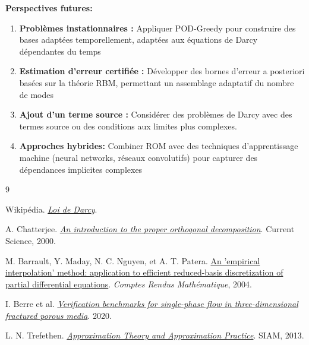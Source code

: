\documentclass[12pt,a4paper]{article}
\begin{document}
\textbf{Perspectives futures:}
\begin{enumerate}
    \item \textbf{Problèmes instationnaires :} Appliquer POD-Greedy pour construire des bases adaptées temporellement, adaptées aux équations de Darcy dépendantes du temps
    \item \textbf{Estimation d'erreur certifiée :} Développer des bornes d'erreur a posteriori basées sur la théorie RBM, permettant un assemblage adaptatif du nombre de modes
    \item \textbf{Ajout d'un terme source :} Considérer des problèmes de Darcy avec des termes source ou des conditions aux limites plus complexes.
    \item \textbf{Approches hybrides:} Combiner ROM avec des techniques d'apprentissage machine (neural networks, réseaux convolutifs) pour capturer des dépendances implicites complexes
\end{enumerate}
 
\newpage
 

\begin{thebibliography}{9}

Wikipédia.
\href{https://fr.wikipedia.org/wiki/Loi_de_Darcy}{\emph{Loi de Darcy}}.

A. Chatterjee.
\href{https://www.researchgate.net/publication/255613988}{\emph{An introduction to the proper orthogonal decomposition}}.
Current Science, 2000.

M. Barrault, Y. Maday, N. C. Nguyen, et A. T. Patera.
\href{https://doi.org/10.1016/j.crma.2004.08.006}{An 'empirical interpolation' method: application to efficient reduced-basis discretization of partial differential equations}.
\emph{Comptes Rendus Mathématique}, 2004.

I. Berre et al.
\href{https://arxiv.org/pdf/2002.07005}{\emph{Verification benchmarks for single-phase flow in three-dimensional fractured porous media}}.
2020.

L. N. Trefethen.
\href{https://www.chebfun.org/ATAP/}{\emph{Approximation Theory and Approximation Practice}}.
SIAM, 2013.

\end{thebibliography}
\end{document}
